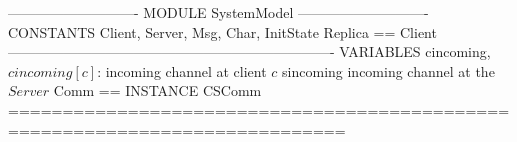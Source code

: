\documentclass{article}
\begin{document}
\begin{tla}
---------------------------- MODULE SystemModel ----------------------------
CONSTANTS Client, Server, Msg, Char, InitState
Replica == Client 
----------------------------------------------------------------------
VARIABLES cincoming,  \* $cincoming[c]$: incoming channel at client $c$ 
          sincoming   \* incoming channel at the $Server$
Comm == INSTANCE CSComm
=============================================================================
\end{tla}
\end{document}
